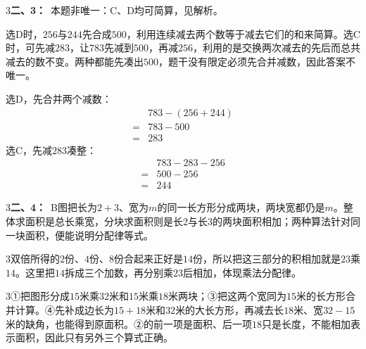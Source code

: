 \documentclass[multi=snippet,border={5bp 20bp 5bp 5bp}]{standalone}
\newenvironment{snippet}[3]{\begin{minipage}{#1bp}\color{answerred}\fontsize{#2}{#3}\selectfont\raggedright}{\end{minipage}}
\begin{document}
\begin{snippet}{505}{11.5}{14}\begin{multicols}{3}\raggedcolumns \textbf{二、3：}\ 本题非唯一：C、D均可简算，见解析。\par 选D时，\(256\)\allowbreak 与\(244\)\allowbreak 先合成\(500\)\allowbreak ，利用连续减去两个数等于减去它们的和来简算。选C时，可先减\(283\)\allowbreak ，让\(783\)\allowbreak 先减到\(500\)\allowbreak ，再减\(256\)\allowbreak ，利用的是交换两次减去的先后而总共减去的数不变。两种都能先凑出\(500\)\allowbreak ，题干没有限定必须先合并减数，因此答案不唯一。\par 选D，先合并两个减数：\[\begin{aligned}&783-(256+244)\\={}&783-500\\={}&283\end{aligned}\]选C，先减\(283\)\allowbreak 凑整：\[\begin{aligned}&783-283-256\\={}&500-256\\={}&244\end{aligned}\]\end{multicols}\end{snippet}
\begin{snippet}{505}{11.5}{14}\begin{multicols}{3}\raggedcolumns \textbf{二、4：}\ B图把长为\(2+3\)\allowbreak 、宽为\(m\)\allowbreak 的同一长方形分成两块，两块宽都仍是\(m\)\allowbreak 。整体求面积是总长乘宽，分块求面积则是长\(2\)\allowbreak 与长\(3\)\allowbreak 的两块面积相加；两种算法针对同一块面积，便能说明分配律等式。\end{multicols}\end{snippet}
\begin{snippet}{505}{11.5}{14}\begin{multicols}{3}\raggedcolumns 双倍所得的\(2\)\allowbreak 份、\(4\)\allowbreak 份、\(8\)\allowbreak 份合起来正好是\(14\)\allowbreak 份，所以把这三部分的积相加就是\(23\)\allowbreak 乘\(14\)\allowbreak 。这里把\(14\)\allowbreak 拆成三个加数，再分别乘\(23\)\allowbreak 后相加，体现乘法分配律。\end{multicols}\end{snippet}
\begin{snippet}{505}{11.5}{14}\begin{multicols}{3}\raggedcolumns ①把图形分成\(15\)\allowbreak 米乘\(32\)\allowbreak 米和\(15\)\allowbreak 米乘\(18\)\allowbreak 米两块；③把这两个宽同为\(15\)\allowbreak 米的长方形合并计算。④先补成边长为\(15+18\)\allowbreak 米和\(32\)\allowbreak 米的大长方形，再减去长\(18\)\allowbreak 米、宽\(32-15\)\allowbreak 米的缺角，也能得到原面积。②的前一项是面积、后一项\(18\)\allowbreak 只是长度，不能相加表示面积，因此只有另外三个算式正确。\end{multicols}\end{snippet}
\end{document}
